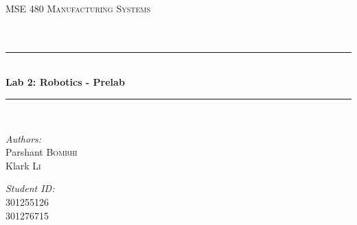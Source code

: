 \documentclass[12pt]{article}
\begin{document}
\begin{titlepage}

\newcommand{\HRule}{\rule{\linewidth}{0.5mm}} %

\center %
 

\textsc{\LARGE MSE 480 Manufacturing Systems}\\[1.5cm] %
\textsc{\Large }\\[0.5cm] %
\textsc{\large }\\[0.5cm] %


\HRule \\[0.4cm]
{ \huge \bfseries Lab 2: Robotics - Prelab}\\[0.4cm] %
\HRule \\[1.5cm]
 

\begin{minipage}{0.4\textwidth}
    \begin{flushleft} \large
        \emph{Authors:}\\
        Parshant \textsc{Bombhi}\\
        Klark \textsc{Li}
    \end{flushleft}
\end{minipage}
\hfill
\begin{minipage}{0.4\textwidth}
    \begin{flushright} \large
        \emph{Student ID:} \\
        301255126\\
        301276715
    \end{flushright}
\end{minipage}
\vspace{10mm}


\end{titlepage}
\end{document}
